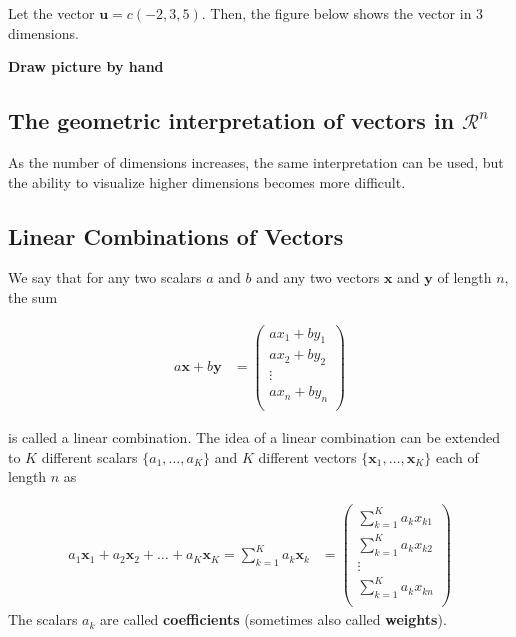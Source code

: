 \documentclass[
]{book}
\theoremstyle{definition}
\theoremstyle{definition}
\theoremstyle{definition}
\theoremstyle{remark}
\begin{document}
Let the vector \(\mathbf{u} = c(-2, 3, 5)\). Then, the figure below shows the vector in 3 dimensions.

\textbf{Draw picture by hand}

\hypertarget{the-geometric-interpretation-of-vectors-in-mathcalrn}{%
\subsection{\texorpdfstring{The geometric interpretation of vectors in \(\mathcal{R}^n\)}{The geometric interpretation of vectors in \textbackslash mathcal\{R\}\^{}n}}\label{the-geometric-interpretation-of-vectors-in-mathcalrn}}

As the number of dimensions increases, the same interpretation can be used, but the ability to visualize higher dimensions becomes more difficult.

\hypertarget{linear-combinations-of-vectors}{%
\subsection{Linear Combinations of Vectors}\label{linear-combinations-of-vectors}}

We say that for any two scalars \(a\) and \(b\) and any two vectors \(\mathbf{x}\) and \(\mathbf{y}\) of length \(n\), the sum

\[
\begin{aligned}
a \mathbf{x} + b \mathbf{y} & = \begin{pmatrix}
a x_1 + b y_1 \\
a x_2 + b y_2 \\
\vdots \\
a x_n + b y_n \\
\end{pmatrix}
\end{aligned}
\]

is called a linear combination. The idea of a linear combination can be extended to \(K\) different scalars \(\{ a_1, \ldots, a_K \}\) and \(K\) different vectors \(\{ \mathbf{x}_1, \ldots, \mathbf{x}_K\}\) each of length \(n\) as

\[
 \begin{aligned}
a_1 \mathbf{x}_1 + a_2 \mathbf{x}_2 +  \ldots + a_K \mathbf{x}_K = 
\sum_{k=1}^K a_k \mathbf{x}_k & = \begin{pmatrix}
\sum_{k=1}^K a_k x_{k1} \\
\sum_{k=1}^K a_k x_{k2} \\
\vdots \\
\sum_{k=1}^K a_k x_{kn} \\
\end{pmatrix}
\end{aligned}
\]
The scalars \(a_k\) are called \textbf{coefficients} (sometimes also called \textbf{weights}).
\end{document}
